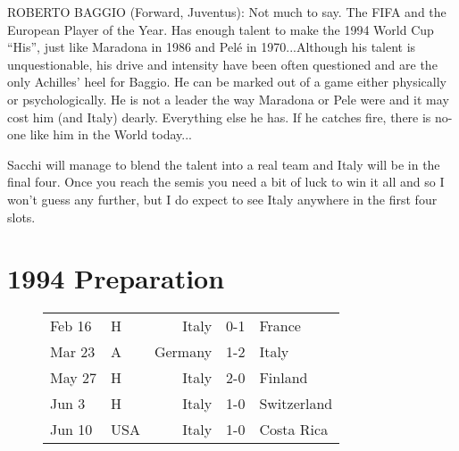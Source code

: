 ROBERTO BAGGIO (Forward, Juventus):
Not much to say. The FIFA and the European Player of the Year. Has enough 
talent to make the 1994 World Cup ``His'', just like Maradona in 1986 and Pel{\'e} 
in 1970...Although his talent is unquestionable, his drive and intensity have 
been often questioned and are the only Achilles' heel for Baggio. He can be 
marked out of a game either physically or psychologically. He is not a leader 
the way Maradona or Pele were and it may cost him (and Italy) dearly. 
Everything else he has. If he catches fire, there is no-one like him in the 
World today...

Sacchi will manage to blend the talent into a real team and Italy will be in 
the final four. Once you reach the semis you need a bit of luck to win it all 
and so I won't guess any further, but I do expect to see Italy anywhere in the 
first four slots.
\section{1994 Preparation}
\begin{figure}[H]
\begin{tabular}{l l r c l}
Feb 16 & H & Italy & 0-1 & France \\
Mar 23 & A & Germany & 1-2 & Italy \\
May 27 & H & Italy & 2-0 & Finland \\
Jun 3 & H & Italy & 1-0 & Switzerland \\
Jun 10 & USA & Italy & 1-0 & Costa Rica \\
\end{tabular}
\end{figure}
